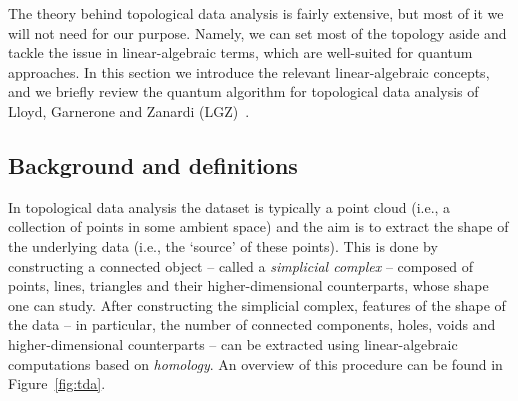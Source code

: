 \documentclass[a4paper, onecolumn, accepted=2022-08-28]{quantumarticle}
\begin{document}
The theory behind topological data analysis is fairly extensive, but most of it we will not need for our purpose.
Namely, we can set most of the topology aside and tackle the issue in linear-algebraic terms, which are well-suited for quantum approaches.
In this section we introduce the relevant linear-algebraic concepts, and we briefly review the quantum algorithm for topological data analysis of Lloyd, Garnerone and Zanardi (LGZ)~\cite{lloyd:lgz_algorithm}.

\subsection{Background and definitions
  \label{subsec:background&defs}}

In topological data analysis the dataset is typically a point cloud (i.e., a collection of points in some ambient space) and the aim is to extract the shape of the underlying data (i.e., the `source' of these points).
This is done by constructing a connected object -- called a \emph{simplicial complex} -- composed of points, lines, triangles and their higher-dimensional counterparts, whose shape one can study.
After constructing the simplicial complex, features of the shape of the data -- in particular, the number of connected components, holes, voids and higher-dimensional counterparts -- can be extracted using linear-algebraic computations based on \emph{homology}.
An overview of this procedure can be found in Figure~\ref{fig:tda}.
\end{document}
